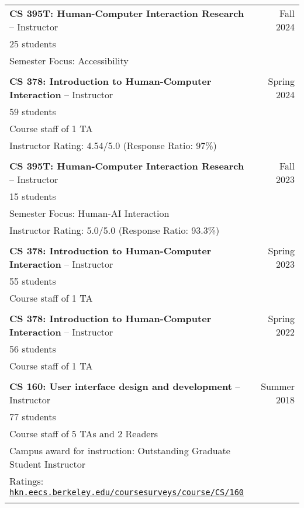 \begin{longtable}{Xr}
	\textbf{CS 395T: Human-Computer Interaction Research} -- Instructor & Fall 2024 \\
	25 students &  \\
	Semester Focus: Accessibility &  \\
	\\

	\textbf{CS 378: Introduction to Human-Computer Interaction} -- Instructor & Spring 2024 \\
	59 students &  \\
	Course staff of 1 TA &  \\
	Instructor Rating: 4.54/5.0 (Response Ratio: 97\%) &  \\
	\\

	\textbf{CS 395T: Human-Computer Interaction Research} -- Instructor & Fall 2023 \\
	15 students &  \\
	Semester Focus: Human-AI Interaction &  \\
	Instructor Rating: 5.0/5.0 (Response Ratio: 93.3\%) &  \\
	\\

	\textbf{CS 378: Introduction to Human-Computer Interaction} -- Instructor & Spring 2023 \\
	55 students &  \\
	Course staff of 1 TA &  \\
	\\

	\textbf{CS 378: Introduction to Human-Computer Interaction} -- Instructor & Spring 2022 \\
	56 students &  \\
	Course staff of 1 TA &  \\
	\\

	\textbf{CS 160: User interface design and development} -- Instructor & Summer 2018 \\
	77 students &  \\
	Course staff of 5 TAs and 2 Readers &  \\
	Campus award for instruction: Outstanding Graduate Student Instructor &  \\
	Ratings: \href{https://hkn.eecs.berkeley.edu/coursesurveys/course/CS/160}{\tt hkn.eecs.berkeley.edu/coursesurveys/course/CS/160} &  \\
	\\


\end{longtable}
